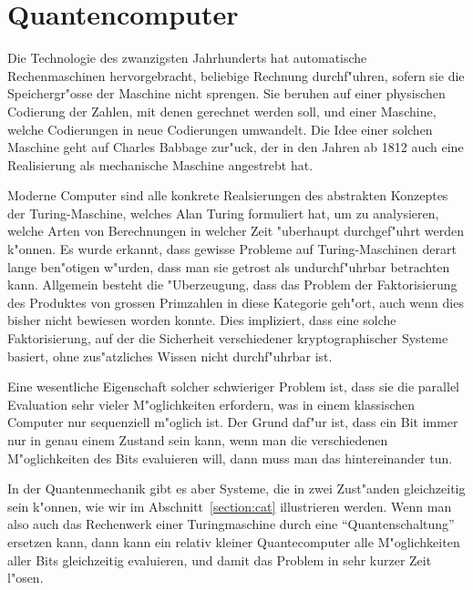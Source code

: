 \chapter{Quantencomputer\label{chapter:quantencomputer}}
\rhead{}
Die Technologie des zwanzigsten Jahrhunderts hat automatische
Rechenmaschinen hervorgebracht, beliebige Rechnung durchf"uhren,
sofern sie die Speichergr"osse der Maschine nicht sprengen.
Sie beruhen auf einer physischen Codierung der Zahlen, mit denen
gerechnet werden soll, und einer Maschine, welche Codierungen 
in neue Codierungen umwandelt.
Die Idee einer solchen Maschine geht auf Charles Babbage zur"uck,
der in den Jahren ab 1812 auch eine Realisierung als mechanische
Maschine angestrebt hat.

Moderne Computer sind alle konkrete Realsierungen des abstrakten
Konzeptes der Turing-Maschine, welches Alan Turing formuliert hat,
um zu analysieren, welche Arten von Berechnungen in welcher Zeit
"uberhaupt durchgef"uhrt werden k"onnen.
Es wurde erkannt, dass gewisse Probleme auf Turing-Maschinen
derart lange ben"otigen w"urden, dass man sie getrost als undurchf"uhrbar
betrachten kann.
Allgemein besteht die "Uberzeugung, dass das Problem der Faktorisierung
des Produktes von grossen Primzahlen in diese Kategorie geh"ort,
auch wenn dies bisher nicht bewiesen worden konnte.
Dies impliziert, dass eine solche Faktorisierung, auf der die Sicherheit
verschiedener kryptographischer Systeme basiert, ohne zus"atzliches
Wissen nicht durchf"uhrbar ist.

Eine wesentliche Eigenschaft solcher schwieriger Problem ist, dass
sie die parallel Evaluation sehr vieler M"oglichkeiten erfordern,
was in einem klassischen Computer nur sequenziell m"oglich ist.
Der Grund daf"ur ist, dass ein Bit immer nur in genau einem
Zustand sein kann, wenn man die verschiedenen M"oglichkeiten des
Bits evaluieren will, dann muss man das hintereinander tun.

In der Quantenmechanik gibt es aber Systeme, die in zwei Zust"anden
gleichzeitig sein k"onnen, wie wir im Abschnitt~\ref{section:cat}
illustrieren werden.
Wenn man also auch das Rechenwerk einer Turingmaschine durch eine
``Quantenschaltung'' ersetzen kann, dann kann ein relativ kleiner
Quantecomputer alle M"oglichkeiten aller Bits gleichzeitig evaluieren,
und damit das Problem in sehr kurzer Zeit l"osen.

